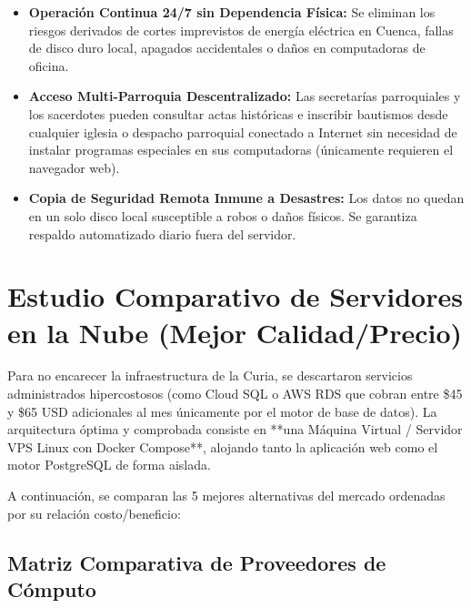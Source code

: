\documentclass[11pt,a4paper]{article}
\begin{document}
\begin{itemize}[leftmargin=1.5cm]
    \item[\color{azulcuria}\checkmark] \textbf{Operación Continua 24/7 sin Dependencia Física:} Se eliminan los riesgos derivados de cortes imprevistos de energía eléctrica en Cuenca, fallas de disco duro local, apagados accidentales o daños en computadoras de oficina.
    \item[\color{azulcuria}\checkmark] \textbf{Acceso Multi-Parroquia Descentralizado:} Las secretarías parroquiales y los sacerdotes pueden consultar actas históricas e inscribir bautismos desde cualquier iglesia o despacho parroquial conectado a Internet sin necesidad de instalar programas especiales en sus computadoras (únicamente requieren el navegador web).
    \item[\color{azulcuria}\checkmark] \textbf{Copia de Seguridad Remota Inmune a Desastres:} Los datos no quedan en un solo disco local susceptible a robos o daños físicos. Se garantiza respaldo automatizado diario fuera del servidor.
\end{itemize}

\section{Estudio Comparativo de Servidores en la Nube (Mejor Calidad/Precio)}

Para no encarecer la infraestructura de la Curia, se descartaron servicios administrados hipercostosos (como Cloud SQL o AWS RDS que cobran entre \$45 y \$65 USD adicionales al mes únicamente por el motor de base de datos). La arquitectura óptima y comprobada consiste en **una Máquina Virtual / Servidor VPS Linux con Docker Compose**, alojando tanto la aplicación web como el motor PostgreSQL de forma aislada.

A continuación, se comparan las 5 mejores alternativas del mercado ordenadas por su relación costo/beneficio:

\subsection{Matriz Comparativa de Proveedores de Cómputo}
\end{document}
